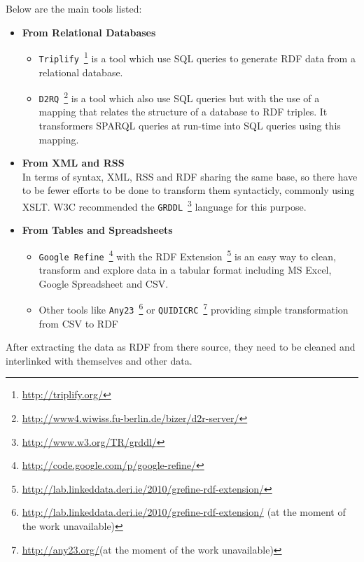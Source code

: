 \documentclass{article}
\begin{document}
Below are the main tools listed:
\begin{itemize}
	\item \textbf{From Relational Databases}
	\begin{itemize}
		\item \texttt{Triplify}~\footnote{\url{http://triplify.org/}} is a tool which use SQL queries to generate RDF data from a relational database.
		\item \texttt{D2RQ}~\footnote{\url{http://www4.wiwiss.fu-berlin.de/bizer/d2r-server/}} is a tool which also use SQL queries but with the use of a mapping that relates the structure of a database to RDF triples. It transformers SPARQL queries at run-time into SQL queries using this mapping.
	\end{itemize}
	\item \textbf{From XML and RSS}~\\
	In terms of syntax, XML, RSS and RDF sharing the same base, so there have to be fewer efforts to be done to transform them syntacticly, commonly using XSLT. W3C recommended the \texttt{GRDDL}~\footnote{\url{http://www.w3.org/TR/grddl/}} language for this purpose.
	\item \textbf{From Tables and Spreadsheets}
	\begin{itemize}
		\item \texttt{Google Refine}~\footnote{\url{http://code.google.com/p/google-refine/}} with the RDF Extension~\footnote{\url{http://lab.linkeddata.deri.ie/2010/grefine-rdf-extension/}} is an easy way to clean, transform and explore data in a tabular format including MS Excel, Google Spreadsheet and CSV.
		\item Other tools like \texttt{Any23}~\footnote{\url{http://lab.linkeddata.deri.ie/2010/grefine-rdf-extension/} (at the moment of the work unavailable)} or \texttt{QUIDICRC}~\footnote{\url{http://any23.org/}(at the moment of the work unavailable)} providing simple transformation from CSV to RDF
	\end{itemize}
\end{itemize}

After extracting the data as RDF from there source, they need to be cleaned and interlinked with themselves and other data.
\end{document}
